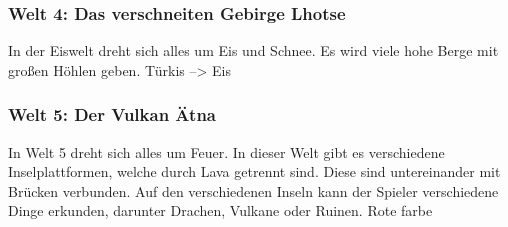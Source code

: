 \subsubsection{Welt 4: Das verschneiten Gebirge Lhotse}
	In der Eiswelt dreht sich alles um Eis und Schnee. Es wird viele hohe Berge mit großen Höhlen geben. Türkis --> Eis
	
\subsubsection{Welt 5: Der Vulkan Ätna}
	In Welt 5 dreht sich alles um Feuer. In dieser Welt gibt es verschiedene Inselplattformen, welche durch Lava getrennt sind. Diese sind untereinander mit Brücken verbunden. Auf den verschiedenen Inseln kann der Spieler verschiedene Dinge erkunden, darunter Drachen, Vulkane oder Ruinen. Rote farbe
